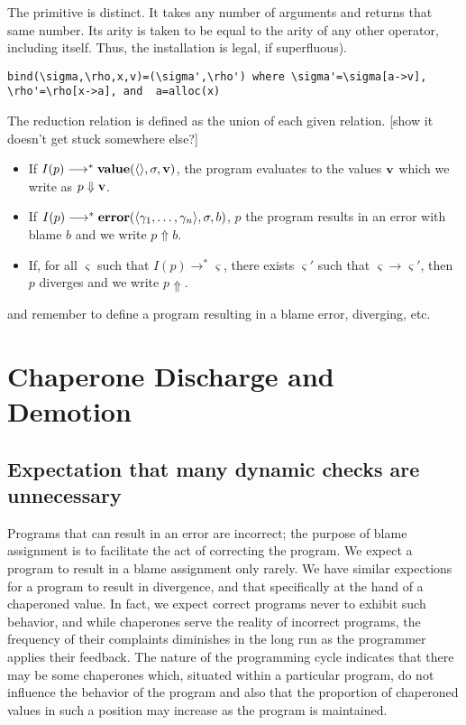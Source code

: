 \documentclass{sigplanconf}
\begin{document}
The  primitive is distinct.
It takes any number of arguments and returns that same number.
Its arity is taken to be equal to the arity of any other operator, including itself.
Thus, the installation  is legal, if superfluous).

\begin{verbatim}
bind(\sigma,\rho,x,v)=(\sigma',\rho') where \sigma'=\sigma[a->v], \rho'=\rho[x->a], and  a=alloc(x)
\end{verbatim}

The reduction relation is defined as the union of each given relation.
[show it doesn't get stuck somewhere else?]
\begin{itemize}
\item If $I(p)\longrightarrow^{*}\mathbf{value}(\langle\rangle,\sigma,\mathbf{v})$, the program evaluates to the values $\mathbf{v}$ which we write as $p\Downarrow\mathbf{v}$.
\item If $I(p)\longrightarrow^{*}\mathbf{error}(\langle\gamma_1,\dots,\gamma_n\rangle,\sigma,b)$, $p$ the program results in an error with blame $b$ and we write $p\Uparrow b$.
\item If, for all $\varsigma$ such that $I(p)\longrightarrow^{*}\varsigma$, there exists $\varsigma'$ such that $\varsigma\longrightarrow\varsigma'$, then $p$ diverges and we write $p\Uparrow$.
\end{itemize}


and remember to define a program resulting in a blame error, diverging, etc.

\section{Chaperone Discharge and Demotion}

\subsection{Expectation that many dynamic checks are unnecessary}

Programs that can result in an error are incorrect; the purpose of blame assignment is to facilitate the act of correcting the program.
We expect a program to result in a blame assignment only rarely.
We have similar expections for a program to result in divergence, and that specifically at the hand of a chaperoned value.
In fact, we expect correct programs never to exhibit such behavior, and while chaperones serve the reality of incorrect programs, the frequency of their complaints diminishes in the long run as the programmer applies their feedback.
The nature of the programming cycle indicates that there may be some chaperones which, situated within a particular program, do not influence the behavior of the program and also that the proportion of chaperoned values in such a position may increase as the program is maintained.
\end{document}
